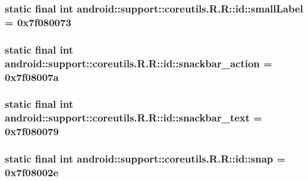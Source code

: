\hypertarget{classandroid_1_1support_1_1coreutils_1_1_r_1_1id_9c513848819bb2ae0ff6a6d1f031e6e0}{
\subsubsection[{smallLabel}]{\setlength{\rightskip}{0pt plus 5cm}static final int android::support::coreutils.R.R::id::smallLabel = 0x7f080073}}
\label{classandroid_1_1support_1_1coreutils_1_1_r_1_1id_9c513848819bb2ae0ff6a6d1f031e6e0}


\hypertarget{classandroid_1_1support_1_1coreutils_1_1_r_1_1id_f98eb2a86a90446a2be3441e75694f49}{
\subsubsection[{snackbar\_\-action}]{\setlength{\rightskip}{0pt plus 5cm}static final int android::support::coreutils.R.R::id::snackbar\_\-action = 0x7f08007a}}
\label{classandroid_1_1support_1_1coreutils_1_1_r_1_1id_f98eb2a86a90446a2be3441e75694f49}


\hypertarget{classandroid_1_1support_1_1coreutils_1_1_r_1_1id_aebf8dadf3ecdbccb0bf18818107f43e}{
\subsubsection[{snackbar\_\-text}]{\setlength{\rightskip}{0pt plus 5cm}static final int android::support::coreutils.R.R::id::snackbar\_\-text = 0x7f080079}}
\label{classandroid_1_1support_1_1coreutils_1_1_r_1_1id_aebf8dadf3ecdbccb0bf18818107f43e}


\hypertarget{classandroid_1_1support_1_1coreutils_1_1_r_1_1id_04f3850b08d0e6b10bddb05a86827b17}{
\subsubsection[{snap}]{\setlength{\rightskip}{0pt plus 5cm}static final int android::support::coreutils.R.R::id::snap = 0x7f08002e}}
\label{classandroid_1_1support_1_1coreutils_1_1_r_1_1id_04f3850b08d0e6b10bddb05a86827b17}


